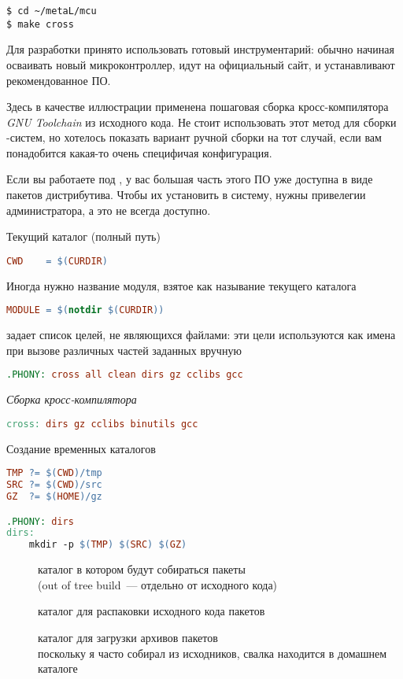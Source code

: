 
\begin{verbatim}
$ cd ~/metaL/mcu
$ make cross
\end{verbatim}

Для разработки принято использовать готовый инструментарий: обычно начиная
осваивать новый микроконтроллер, идут на официальный сайт, и устанавливают
рекомендованное ПО.

Здесь в качестве иллюстрации применена пошаговая сборка кросс-компилятора
\emph{GNU Toolchain} из исходного кода. Не стоит использовать этот метод для
сборки \linux-систем, но хотелось показать вариант ручной сборки на тот случай,
если вам понадобится какая-то очень специфичая конфигурация.

Если вы работаете под \linux, у вас большая часть этого ПО уже доступна в виде
пакетов дистрибутива. Чтобы их установить в систему, нужны привелегии
администратора, а это не всегда доступно. 

\clearpage\noindent
Текущий каталог (полный путь)
\begin{lstlisting}[language=make]
CWD    = $(CURDIR)
\end{lstlisting}
Иногда нужно название модуля, взятое как называние текущего каталога
\begin{lstlisting}[language=make]
MODULE = $(notdir $(CURDIR))
\end{lstlisting}
 задает список целей, не являющихся файлами: эти цели используются
как имена при вызове различных частей  заданных вручную
\begin{lstlisting}[language=make]
.PHONY: cross all clean dirs gz cclibs gcc
\end{lstlisting}
\emph{Сборка кросс-компилятора}
\begin{lstlisting}[language=make]
cross: dirs gz cclibs binutils gcc
\end{lstlisting}
Создание временных каталогов
\begin{lstlisting}[language=make]
TMP ?= $(CWD)/tmp
SRC ?= $(CWD)/src
GZ  ?= $(HOME)/gz

.PHONY: dirs
dirs:
	mkdir -p $(TMP) $(SRC) $(GZ)
\end{lstlisting}
\begin{description}
\item[] каталог в котором будут собираться пакеты\\(out of
tree build\ --- отдельно от исходного кода)
\item[] каталог для распаковки исходного кода пакетов
\item[] каталог для загрузки архивов пакетов\\
поскольку я часто собирал из исходников, свалка находится в домашнем каталоге 
\end{description}

